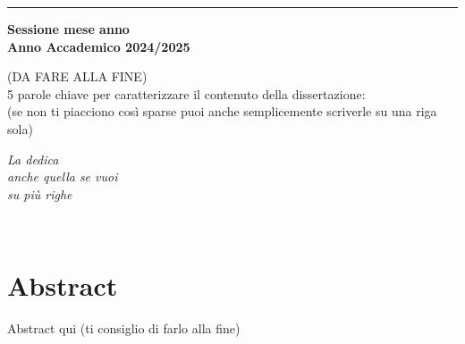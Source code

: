\documentclass[12pt,a4paper,twoside]{book}
\begin{document}
\begin{titlepage}
\vspace{30mm}

\rule[0.5cm]{15.8cm}{0.6mm}

\begin{center}
{\large{\bf Sessione mese anno \\}}
{\large{\bf Anno Accademico 2024/2025\\}}
\end{center}

\end{titlepage}

\restoregeometry
\newpage
\begin{center}
    (DA FARE ALLA FINE)\\
    5 parole chiave per caratterizzare il contenuto della dissertazione:\\ (se non ti piacciono così sparse puoi anche semplicemente scriverle su una riga sola)
\end{center}

\newpage

\topmargin=6.5cm
\begin{flushright}
\emph{
\LARGE{La dedica}\\\vspace{2mm}
\LARGE{anche quella se vuoi}\\\vspace{3mm} 
\LARGE{su più righe} 
}
\end{flushright}
\newpage~\newpage
{}
\chapter*{Abstract}
Abstract qui (ti consiglio di farlo alla fine)

\topmargin=-1cm
\tableofcontents
\thispagestyle{empty}
\listoftables
\thispagestyle{empty}
\listoffigures
\thispagestyle{empty}
\newpage~\newpage


\setcounter{chapter}{-1}
\raggedbottom
\end{document}
